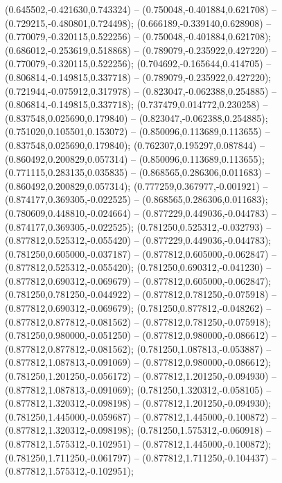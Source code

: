  (0.645502,-0.421630,0.743324) -- (0.750048,-0.401884,0.621708) -- (0.729215,-0.480801,0.724498);
 (0.666189,-0.339140,0.628908) -- (0.770079,-0.320115,0.522256) -- (0.750048,-0.401884,0.621708);
 (0.686012,-0.253619,0.518868) -- (0.789079,-0.235922,0.427220) -- (0.770079,-0.320115,0.522256);
 (0.704692,-0.165644,0.414705) -- (0.806814,-0.149815,0.337718) -- (0.789079,-0.235922,0.427220);
 (0.721944,-0.075912,0.317978) -- (0.823047,-0.062388,0.254885) -- (0.806814,-0.149815,0.337718);
 (0.737479,0.014772,0.230258) -- (0.837548,0.025690,0.179840) -- (0.823047,-0.062388,0.254885);
 (0.751020,0.105501,0.153072) -- (0.850096,0.113689,0.113655) -- (0.837548,0.025690,0.179840);
 (0.762307,0.195297,0.087844) -- (0.860492,0.200829,0.057314) -- (0.850096,0.113689,0.113655);
 (0.771115,0.283135,0.035835) -- (0.868565,0.286306,0.011683) -- (0.860492,0.200829,0.057314);
 (0.777259,0.367977,-0.001921) -- (0.874177,0.369305,-0.022525) -- (0.868565,0.286306,0.011683);
 (0.780609,0.448810,-0.024664) -- (0.877229,0.449036,-0.044783) -- (0.874177,0.369305,-0.022525);
 (0.781250,0.525312,-0.032793) -- (0.877812,0.525312,-0.055420) -- (0.877229,0.449036,-0.044783);
 (0.781250,0.605000,-0.037187) -- (0.877812,0.605000,-0.062847) -- (0.877812,0.525312,-0.055420);
 (0.781250,0.690312,-0.041230) -- (0.877812,0.690312,-0.069679) -- (0.877812,0.605000,-0.062847);
 (0.781250,0.781250,-0.044922) -- (0.877812,0.781250,-0.075918) -- (0.877812,0.690312,-0.069679);
 (0.781250,0.877812,-0.048262) -- (0.877812,0.877812,-0.081562) -- (0.877812,0.781250,-0.075918);
 (0.781250,0.980000,-0.051250) -- (0.877812,0.980000,-0.086612) -- (0.877812,0.877812,-0.081562);
 (0.781250,1.087813,-0.053887) -- (0.877812,1.087813,-0.091069) -- (0.877812,0.980000,-0.086612);
 (0.781250,1.201250,-0.056172) -- (0.877812,1.201250,-0.094930) -- (0.877812,1.087813,-0.091069);
 (0.781250,1.320312,-0.058105) -- (0.877812,1.320312,-0.098198) -- (0.877812,1.201250,-0.094930);
 (0.781250,1.445000,-0.059687) -- (0.877812,1.445000,-0.100872) -- (0.877812,1.320312,-0.098198);
 (0.781250,1.575312,-0.060918) -- (0.877812,1.575312,-0.102951) -- (0.877812,1.445000,-0.100872);
 (0.781250,1.711250,-0.061797) -- (0.877812,1.711250,-0.104437) -- (0.877812,1.575312,-0.102951);
